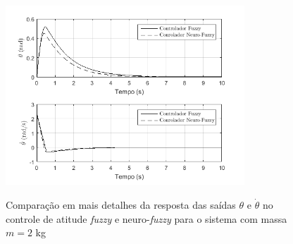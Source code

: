 \begin{figure}[!htb]
    \centering
    \caption{Comparação em mais detalhes da resposta das saídas $\theta$ e $\dot{\theta}$ no controle de atitude \textit{fuzzy} e neuro-\textit{fuzzy} para o sistema com massa $m=2$ kg}
    \includegraphics[width=0.8\textwidth]{./04-figuras/resultados/novos/atitude_theta_thetadot_2kg_10s}
    \label{fig:atitude_theta_thetadot_2kg_10s}
\end{figure}
